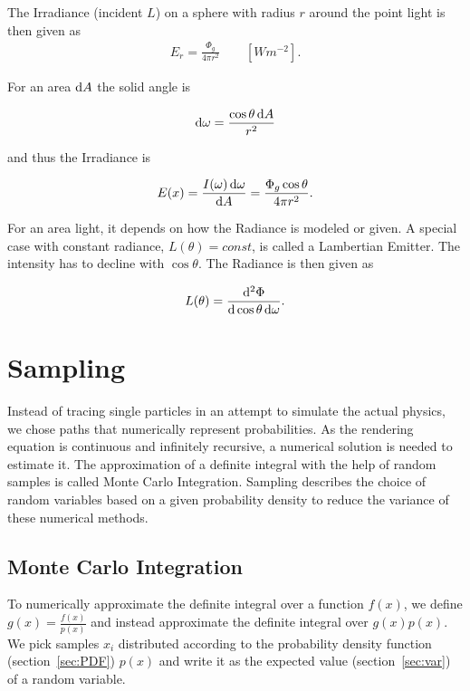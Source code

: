 The Irradiance (incident $L$) on a sphere with radius $r$ around the point light is then given as
\begin{align}
E_r =  \frac{\Phi_g}{4\pi r^2} \qquad [ W m^{-2} ] .
\end{align}

For an area $\mathop{}\!\mathrm{d} A$ the solid angle is 

\begin{align}
\mathop{}\!\mathrm{d} \omega = \frac{\cos \theta \mathop{}\!\mathrm{d} A}{r^2}  
\end{align}


and thus the Irradiance is

\begin{align}
E(x) = \frac{ I(\omega) \mathop{}\!\mathrm{d} \omega }{ \mathop{}\!\mathrm{d} A } = \frac{ \Phi_g \cos \theta }{ 4 \pi r^2}.
\end{align}

For an area light, it depends on how the Radiance is modeled or given. A special case with constant radiance, $L(\theta) = const$, is called a Lambertian Emitter. The intensity has to decline with $\cos\theta$. The Radiance is then given as 

\begin{align}
L(\theta) = \frac{\mathop{}\!\mathrm{d}^2\Phi}{\mathop{}\!\mathrm{d}\cos\theta\mathop{}\!\mathrm{d}\omega}.
\end{align}



\section{Sampling}

Instead of tracing single particles in an attempt to simulate the actual physics, we chose paths that numerically represent probabilities. As the rendering equation is continuous and infinitely recursive, a numerical solution is needed to estimate it. The approximation of a definite integral with the help of random samples is called Monte Carlo Integration. Sampling describes the choice of random variables based on a given probability density to reduce the variance of these numerical methods.

\subsection{Monte Carlo Integration}
\label{sec:montecarlo}
\label{sec:MC}

To numerically approximate the definite integral over a function $f(x)$, we define $g(x) = \frac{f(x)}{p(x)}$ and instead approximate the definite integral over $g(x)p(x)$. We pick samples $x_i$ distributed according to the probability density function (section~\ref{sec:PDF}) $p(x)$ and write it as the expected value (section~\ref{sec:var}) of a random variable.


